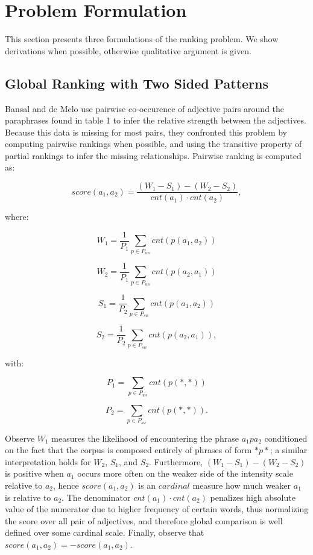 \section{Problem Formulation}

This section presents three formulations of the ranking problem. We show derivations when possible, otherwise qualitative argument is given.

\subsection{Global Ranking with Two Sided Patterns}

Bansal and de Melo  use pairwise co-occurence of adjective pairs around the paraphrases found in table 1 to infer the relative strength between the adjectives. Because this data is missing for most pairs, they confronted this problem by computing pairwise rankings when possible, and using the transitive property of partial rankings to infer the missing relationships. Pairwise ranking is computed as:

\[ score(a_1, a_2) = \frac{(W_1 - S_1) - (W_2 - S_2)}{cnt(a_1) \cdot cnt(a_2)}, \]

where:

\[ W_1 = \frac{1}{P_1} \sum_{p \in P_{ws}} cnt(p(a_1, a_2))\]

\[ W_2 = \frac{1}{P_1} \sum_{p \in P_{ws}} cnt(p(a_2, a_1))\]

\[ S_1 = \frac{1}{P_2} \sum_{p \in P_{sw}} cnt(p(a_1, a_2))\]

\[ S_2 = \frac{1}{P_2} \sum_{p \in P_{sw}} cnt(p(a_2, a_1)),\]

with:

\[ P_1 = \sum_{p \in P_{ws}} cnt(p(*, *))\]

\[ P_2 = \sum_{p \in P_{sw}} cnt(p(*, *)).\]


Observe $W_1$ measures the likelihood of encountering the phrase $a_1 p a_2$ conditioned on the fact that the corpus is composed 
entirely of phrases of form $* p *$; a similar interpretation holds for $W_2$, $S_1$, and $S_2$. Furthermore, $(W_1 - S_1) - (W_2 - S_2)$ is positive when $a_1$ occurs more often on the weaker side of the intensity scale relative to $a_2$, hence $score(a_1, a_2)$ is an $cardinal$ measure how much weaker $a_1$ is relative to $a_2$. The denominator $cnt(a_1) \cdot cnt(a_2)$ penalizes high absolute value of the numerator due to higher frequency of certain words, thus normalizing the score over all pair of adjectives, and therefore global comparison is well defined over some cardinal scale. Finally, observe that $score(a_1, a_2) = - score(a_1, a_2)$.

